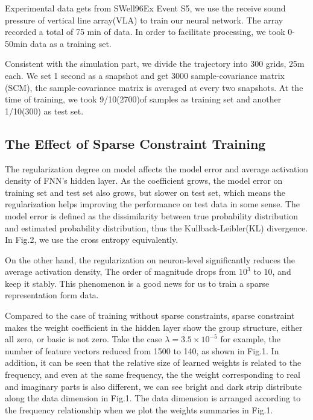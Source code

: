 Experimental data gets from SWell96Ex Event S5, we use the receive sound pressure of vertical line array(VLA) to train our neural network. The array recorded a total of 75 min of data. In order to facilitate processing, we took 0\--50min data as a training set.

Consistent with the simulation part, we divide the trajectory into 300 grids, 25m each. We set 1 second as a snapshot and get 3000 sample-covariance matrix (SCM), the sample-covariance matrix is averaged at every two snapshots.
At the time of training, we took 9/10(2700)of samples as training set and another 1/10(300) as test set.

\subsection{The Effect of Sparse Constraint Training}
The regularization degree on model affects the model error and average activation density of FNN's hidden layer. As the coefficient grows, the model error on training set and test set also grows, but slower on test set, which means
the regularization helps improving the performance on test data in some sense. The model error is defined as the dissimilarity between true probability distribution and estimated probability distribution, thus the Kullback-Leibler(KL) divergence.
In Fig.2, we use the cross entropy equivalently.

On the other hand, the regularization on neuron-level significantly reduces the average activation density,
The order of magnitude drops from $10^{3}$ to $10$, and keep it stably. This phenomenon is a good news for
us to train a sparse representation form data.

Compared to the case of training without sparse constraints, sparse constraint makes the weight coefficient in the hidden layer show the group structure, either all zero, or basic is not zero. Take the case $\lambda=3.5 \times 10^{-5} $
for example, the number of feature vectors reduced from 1500 to 140, as shown in Fig.1. In addition, it can be seen that the relative size of learned weights is related to the frequency, and even at the same frequency, the the weight corresponding
to real and imaginary parts is also different, we can see bright and dark strip distribute along the data dimension in Fig.1. The data dimension is arranged according to the frequency relationship when we plot the weights summaries in Fig.1.


